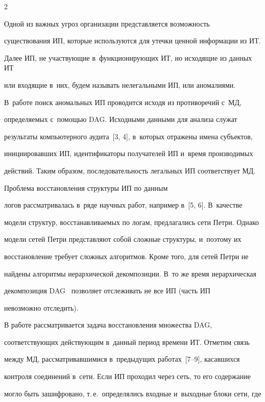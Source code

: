 \begin{multicols}{2}
  


  Одной из важных угроз организации пред\-став\-ля\-ет\-ся возможность 


существования ИП, которые используются для утечки ценной информации из ИТ. 


Далее ИП, не участвующие в~функционирующих ИТ, но исходящие из данных ИТ 


или входящие в~них, будем называть нелегальными ИП, или аномалиями. 


В~работе поиск аномальных ИП проводится исходя из противоречий с~МД, 


определяемых с~помощью DAG. Исходными данными для анализа служат 


результаты компьютерного аудита~[3, 4], в~которых отражены имена субъектов, 


инициировавших ИП, идентификаторы получателей ИП и~время производимых 


действий. Таким образом, последовательность легальных ИП соответствует МД. 


  


  Проблема восстановления структуры ИП по данным 


логов рассматривалась в~ряде научных работ, например в~[5, 6]. В~качестве 


модели структур, восстанавливаемых по логам, предлагались сети Петри. Однако 


модели сетей Петри представляют собой сложные структуры, и~поэтому их 


вос\-ста\-нов\-ле\-ние требует сложных алгоритмов. Кроме того, для сетей Петри не 


найдены алгоритмы иерархической декомпозиции. В~то же время иерархическая 


декомпозиция DAG~\cite{1-gt} позволяет отслеживать не все ИП (часть ИП 


невозможно отследить). 


  


  В работе рассматривается задача восстановления множества DAG, 


соответствующих дей\-ст\-ву\-ющим в~данный период времени ИТ. Отметим связь 


между МД, рассматривавшимися в~предыдущих работах~[7--9], касавшихся 


контроля соединений в~сети. Если ИП проходил через сеть, то его содержание 


могло быть зашифровано, т.\,е.\ определялись входные и~выходные блоки сети, где 



\end{multicols}
